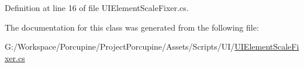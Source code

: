 Definition at line 16 of file U\+I\+Element\+Scale\+Fixer.\+cs.



The documentation for this class was generated from the following file\+:\begin{DoxyCompactItemize}
\item 
G\+:/\+Workspace/\+Porcupine/\+Project\+Porcupine/\+Assets/\+Scripts/\+U\+I/\hyperlink{_u_i_element_scale_fixer_8cs}{U\+I\+Element\+Scale\+Fixer.\+cs}\end{DoxyCompactItemize}
